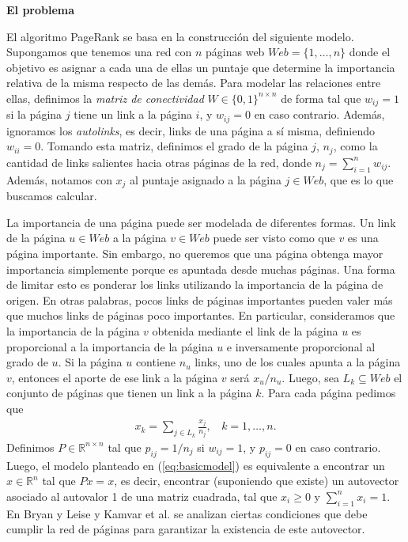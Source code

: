 \textbf{El problema}

El algoritmo PageRank se basa en la construcci\'on del siguiente modelo. Supongamos que tenemos una red con $n$ p\'aginas 
web $Web = \{1,\dots,n\}$ donde
el objetivo es asignar a cada una de ellas un puntaje que determine la importancia relativa de la misma respecto de las
dem\'as. Para modelar las relaciones entre ellas, definimos la \emph{matriz de conectividad} $W \in \{0,1\}^{n \times n}$ 
de forma tal que $w_{ij} = 1$ si la p\'agina $j$ tiene un link a la p\'agina $i$, y $w_{ij} = 0$ en caso contrario. 
Adem\'as, ignoramos los \emph{autolinks}, es decir, links de una p\'agina a s\'i misma, definiendo $w_{ii} = 0$. Tomando 
esta matriz, definimos el grado de la p\'agina $j$, $n_j$, como la cantidad de links salientes hacia otras p\'aginas 
de la red, donde $n_j = \sum_{i = 1}^n w_{ij}$. Adem\'as, notamos con $x_j$ al puntaje asignado a la p\'agina $j\in
Web$, que es lo que buscamos calcular.

La importancia de una p\'agina puede ser modelada de diferentes formas. Un link de la p\'agina $u \in
Web$ a la p\'agina $v \in Web$ puede ser visto como que $v$ es una p\'agina importante. Sin embargo, no queremos que una
p\'agina obtenga mayor importancia simplemente porque es apuntada desde muchas p\'aginas. 
Una forma de limitar esto es ponderar los links utilizando la importancia de la p\'agina de origen. En otras palabras,
pocos links de p\'aginas importantes pueden valer m\'as que muchos links de p\'aginas poco importantes. En particular,
consideramos que la importancia de la p\'agina $v$ obtenida mediante el link de la p\'agina $u$ es proporcional a la 
importancia de la p\'agina $u$ e inversamente proporcional al grado de $u$. Si la p\'agina $u$ contiene $n_u$ links,
uno de los cuales apunta a la p\'agina $v$, entonces el aporte de ese link a la p\'agina $v$ ser\'a $x_u/n_u$. Luego,
sea $L_k \subseteq Web$ el conjunto de p\'aginas que tienen un link a la p\'agina $k$. Para cada p\'agina pedimos que
\begin{eqnarray}
x_k = \sum_{j \in L_k} \frac{x_j}{n_j},~~~~k = 1,\dots,n. \label{eq:basicmodel}
\end{eqnarray}
Definimos $P \in  \mathbb{R}^{n \times n}$ tal que $p_{ij} = 1/n_j$ si $w_{ij} = 1$, y $p_{ij} = 0$ en caso contrario. Luego,
el modelo planteado en (\ref{eq:basicmodel}) es equivalente a encontrar un $x\in \mathbb{R}^n$ tal que $Px = x$, es
decir, encontrar (suponiendo que existe) un autovector asociado al autovalor 1 de una matriz cuadrada, tal que $x_i \ge
0$ y $\sum_{i = 1}^n x_i = 1$. En
Bryan y Leise \cite{Bryan2006} y Kamvar et al. \cite[Secci\'on 1]{Kamvar2003} se analizan ciertas condiciones que debe
cumplir la red de p\'aginas para garantizar la existencia de este autovector.

